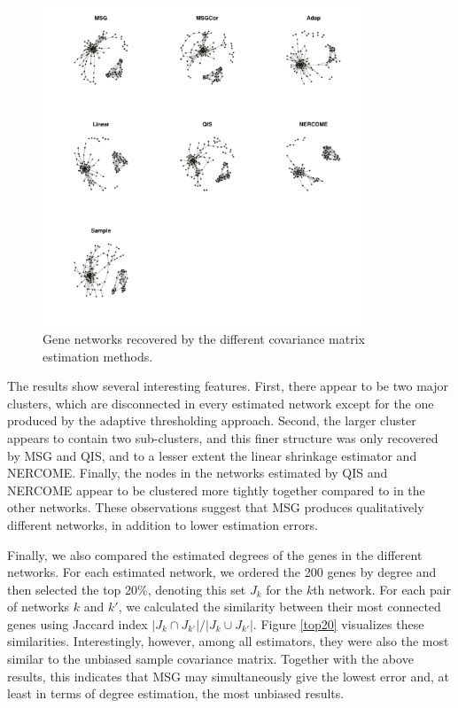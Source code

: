 \begin{figure}
  \centering
  \includegraphics[width=0.85\textwidth]{img/network.pdf}
  \caption{Gene networks recovered by the different covariance matrix estimation methods.}
  \label{network}
\end{figure}

The results show several interesting features. First, there appear to be two major clusters, which are disconnected in every estimated network except for the one produced by the adaptive thresholding approach. Second, the larger cluster appears to contain two sub-clusters, and this finer structure was only recovered by MSG and QIS, and to a lesser extent the linear shrinkage estimator and NERCOME. Finally, the nodes in the networks estimated by QIS and NERCOME appear to be clustered more tightly together compared to in the other networks. These observations suggest that MSG produces qualitatively different networks, in addition to lower estimation errors.

Finally, we also compared the estimated degrees of the genes in the different networks. For each estimated network, we ordered the 200 genes by degree and then selected the top 20\%, denoting this set $J_k$ for the $k$th network. For each pair of networks $k$ and $k'$, we calculated the similarity between their most connected genes using Jaccard index $\vert J_k \cap J_{k'} \vert / \vert J_k \cup J_{k'} \vert$. Figure \ref{top20} visualizes these similarities. Interestingly, however, among all estimators, they were also the most similar to the unbiased sample covariance matrix. Together with the above results, this indicates that MSG may simultaneously give the lowest error and, at least in terms of degree estimation, the most unbiased results.

